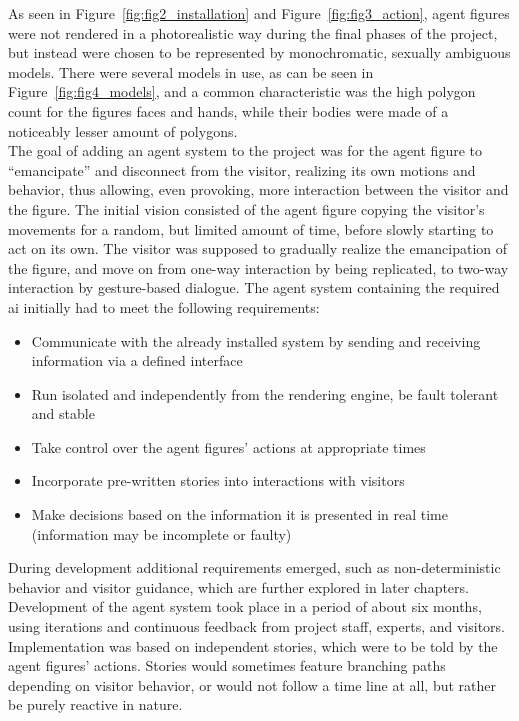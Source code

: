 \documentclass[draft,final]{vutinfth} %
\begin{document}
As seen in Figure~\ref{fig:fig2_installation} and Figure~\ref{fig:fig3_action}, \glspl{agent figure} were not rendered in a photorealistic way during the final phases of the project, but instead were chosen to be represented by monochromatic, sexually ambiguous models. 
There were several models in use, as can be seen in Figure~\ref{fig:fig4_models}, and a common characteristic was the high polygon count for the figures faces and hands, while their bodies were made of a noticeably lesser amount of polygons.\\
The goal of adding an agent system to the project was for the \gls{agent figure} to “emancipate” and disconnect from the \gls{visitor}, realizing its own motions and behavior, thus allowing, even provoking, more interaction between the \gls{visitor} and the figure. 
The initial vision consisted of the \gls{agent figure} copying the \gls{visitor}’s movements for a random, but limited amount of time, before slowly starting to act on its own. 
The \gls{visitor} was supposed to gradually realize the emancipation of the figure, and move on from one-way interaction by being replicated, to two-way interaction by gesture-based dialogue.
The agent system containing the required \gls{ai} initially had to meet the following requirements:
\begin{itemize}
	\item Communicate with the already installed system by sending and receiving information via a defined interface
	\item Run isolated and independently from the rendering engine, be fault tolerant and stable
	\item Take control over the \glspl{agent figure}’ actions at appropriate times
	\item Incorporate pre-written stories into interactions with \glspl{visitor}
	\item Make decisions based on the information it is presented in real time (information may be incomplete or faulty)
\end{itemize}
During development additional requirements emerged, such as non-deterministic behavior and \gls{visitor} guidance, which are further explored in later chapters. \\
Development of the agent system took place in a period of about six months, using iterations and continuous feedback from project staff, experts, and \glspl{visitor}. 
Implementation was based on independent stories, which were to be told by the \glspl{agent figure}’ actions. 
Stories would sometimes feature branching paths depending on \gls{visitor} behavior, or would not follow a time line at all, but rather be purely reactive in nature. 
\end{document}
